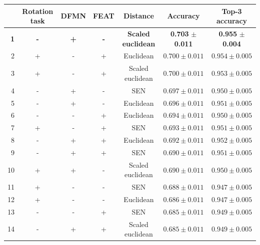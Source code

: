 \documentclass[a4paper, 12pt]{report}
\begin{document}
\begin{table}[h!]
\begin{adjustbox}{center}
\begin{tabular}{| r | c c c c | c |  c | }
\hline
    & Rotation task   & DFMN   & FEAT   & Distance         & Accuracy         & Top-3 accuracy   \\
    
    \hline
 \textbf{1} & \textbf{-} & \textbf{+} & \textbf{-} & \textbf{Scaled} \textbf{euclidean} & \textbf{0.703} $\pm$ \textbf{0.011} & \textbf{0.955} $\pm$ \textbf{0.004} \\
    \hline
  2 & +               & -      & +      & Euclidean        & $0.700 \pm 0.011$ & $0.954 \pm 0.005$ \\
    \hline
  3 & +               & -      & +      & Scaled euclidean & $0.700 \pm 0.011$ & $0.953 \pm 0.005$ \\
    \hline
  4 & -               & +      & -      & SEN              & $0.697 \pm 0.011$ & $0.950 \pm 0.005$ \\
    \hline
  5 & -               & +      & -      & Euclidean        & $0.696 \pm 0.011$ & $0.951 \pm 0.005$ \\
    \hline
  6 & -               & -      & +      & Euclidean        & $0.694 \pm 0.011$ & $0.950 \pm 0.005$ \\
    \hline
  7 & +               & -      & +      & SEN              & $0.693 \pm 0.011$ & $0.951 \pm 0.005$ \\
    \hline
  8 & -               & +      & +      & Euclidean        & $0.692 \pm 0.011$ & $0.952 \pm 0.005$ \\
    \hline
  9 & -               & +      & +      & SEN              & $0.690 \pm 0.011$ & $0.951 \pm 0.005$ \\
    \hline
 10 & +               & +      & -      & Scaled euclidean & $0.690 \pm 0.011$ & $0.950 \pm 0.005$ \\
    \hline
 11 & +               & -      & -      & SEN              & $0.688 \pm 0.011$ & $0.947 \pm 0.005$ \\
    \hline
 12 & +               & -      & -      & Euclidean        & $0.686 \pm 0.011$ & $0.947 \pm 0.005$ \\
    \hline
 13 & -               & -      & +      & SEN              & $0.685 \pm 0.011$ & $0.949 \pm 0.005$ \\
    \hline
 14 & -               & +      & +      & Scaled euclidean & $0.685 \pm 0.011$ & $0.949 \pm 0.005$ \\

\end{tabular}
\end{adjustbox}
\end{table}
\end{document}
